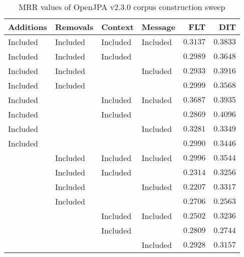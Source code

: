 
\begin{table}
\begin{spacing}{1.2}
\centering
\caption{MRR values of OpenJPA v2.3.0 corpus construction sweep}
\label{table:openjpa_corpus_sweep}
\vspace{0.2em}
\begin{tabular}{llll|rr}
\toprule
Additions &  Removals &   Context &   Message & FLT &        DIT \\
\midrule
 Included &  Included &  Included &  Included &         $0.3137$ &      $0.3833$ \\
 \myrowcolor Included &  Included &  Included &           &         $0.2989$ &      $0.3648$ \\
 Included &  Included &           &  Included &         $0.2933$ &      $0.3916$ \\
 Included &  Included &           &           &         $0.2999$ &      $0.3568$ \\
 Included &           &  Included &  Included &    $\bm{0.3687}$ &      $0.3935$ \\
 Included &           &  Included &           &         $0.2869$ & $\bm{0.4096}$ \\
 Included &           &           &  Included &         $0.3281$ &      $0.3349$ \\
 Included &           &           &           &         $0.2990$ &      $0.3446$ \\
          &  Included &  Included &  Included &         $0.2996$ &      $0.3544$ \\
          &  Included &  Included &           &         $0.2314$ &      $0.3256$ \\
          &  Included &           &  Included &         $0.2207$ &      $0.3317$ \\
          &  Included &           &           &         $0.2706$ &      $0.2563$ \\
          &           &  Included &  Included &         $0.2502$ &      $0.3236$ \\
          &           &  Included &           &         $0.2809$ &      $0.2744$ \\
          &           &           &  Included &         $0.2928$ &      $0.3157$ \\
\bottomrule
\end{tabular}

\end{spacing}
\end{table}
